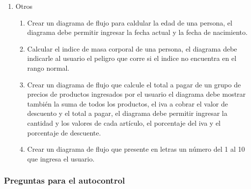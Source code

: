 \documentclass[a4paper,12pt,spanish]{article}
\begin{document}
\begin{enumerate}
\item Otros
  \begin{enumerate}
  \item Crear un diagrama de flujo para caldular la edad de una persona, el diagrama debe permitir ingresar la fecha actual y la fecha de nacimiento.
  \item Calcular el indice de masa corporal de una persona, el diagrama debe indicarle al usuario el peligro que corre si el indice no  encuentra en el rango normal.
  \item Crear un diagrama de flujo que calcule el total  a pagar de un grupo de precios de productos ingresados por el usuario el diagrama debe mostrar también la suma de todos los productos, el iva a cobrar el valor de descuento y el total a pagar, el diagrama debe permitir ingresar la cantidad y los valores de cada artículo, el porcentaje del iva y el porcentaje de descuente.
  \item Crear un diagrama de flujo que presente en letras un número del 1 al 10 que ingresa el usuario.
  \end{enumerate}

  
  
\end{enumerate}





\newpage

\subsubsection{Preguntas para el autocontrol}
\label{sec:preguntas-para-el-2}
\end{document}
